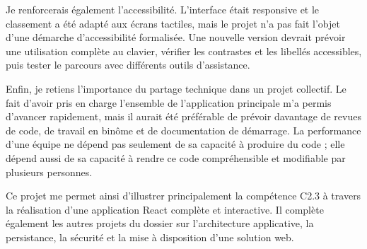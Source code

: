 Je renforcerais également l'accessibilité. L'interface était responsive et le classement a été adapté aux écrans tactiles, mais le projet n'a pas fait l'objet d'une démarche d'accessibilité formalisée. Une nouvelle version devrait prévoir une utilisation complète au clavier, vérifier les contrastes et les libellés accessibles, puis tester le parcours avec différents outils d'assistance.

Enfin, je retiens l'importance du partage technique dans un projet collectif. Le fait d'avoir pris en charge l'ensemble de l'application principale m'a permis d'avancer rapidement, mais il aurait été préférable de prévoir davantage de revues de code, de travail en binôme et de documentation de démarrage. La performance d'une équipe ne dépend pas seulement de sa capacité à produire du code ; elle dépend aussi de sa capacité à rendre ce code compréhensible et modifiable par plusieurs personnes.

Ce projet me permet ainsi d'illustrer principalement la compétence C2.3 à travers la réalisation d'une application React complète et interactive. Il complète également les autres projets du dossier sur l'architecture applicative, la persistance, la sécurité et la mise à disposition d'une solution web.